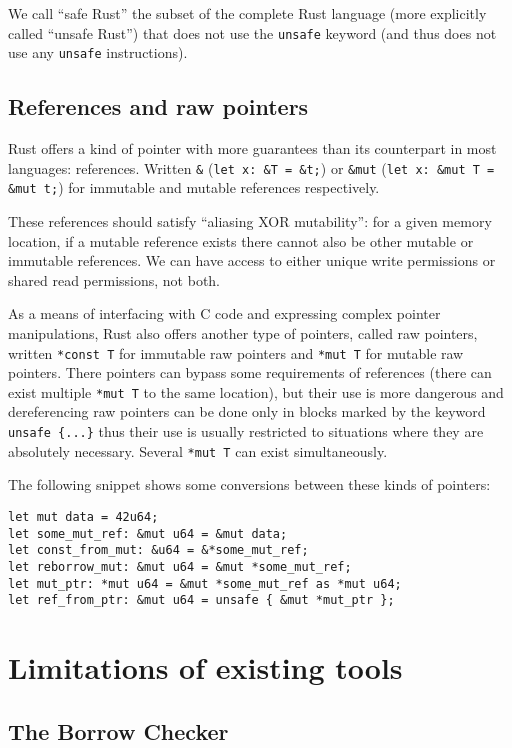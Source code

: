 \documentclass[a4paper,11pt]{article}
\theoremstyle{plain}
\theoremstyle{definition}
\theoremstyle{remark}
\begin{document}
We call ``safe Rust'' the subset of the complete Rust language (more explicitly called ``unsafe Rust'')
that does not use the \texttt{unsafe} keyword (and thus does not use any \texttt{unsafe}
instructions).

\subsection{References and raw pointers}

Rust offers a kind of pointer with more guarantees than its counterpart in most
languages: references. Written \texttt{\&} (\texttt{let x:~\&T = \&t;}) or
\texttt{\&mut} (\texttt{let x:~\&mut T = \&mut t;}) for immutable and mutable
references respectively.

These references should satisfy ``aliasing XOR mutability'': for a given memory
location, if a mutable reference exists there cannot also be other mutable or
immutable references. We can have access to either unique write permissions or
shared read permissions, not both.


As a means of interfacing with C code and expressing complex pointer manipulations,
Rust also offers another type of pointers, called raw pointers, written
\texttt{*const T} for immutable raw pointers and \texttt{*mut T} for mutable
raw pointers. There pointers can bypass some requirements of references (there
can exist multiple \texttt{*mut T} to the same location), but their use is more
dangerous and dereferencing raw pointers can be done only in blocks marked by
the keyword \texttt{unsafe \{...\}} thus their use is usually restricted to
situations where they are absolutely necessary.
Several \texttt{*mut T} can exist simultaneously.


The following snippet shows some conversions between these kinds of pointers:
\begin{lstlisting}
let mut data = 42u64;
let some_mut_ref: &mut u64 = &mut data;
let const_from_mut: &u64 = &*some_mut_ref;
let reborrow_mut: &mut u64 = &mut *some_mut_ref;
let mut_ptr: *mut u64 = &mut *some_mut_ref as *mut u64;
let ref_from_ptr: &mut u64 = unsafe { &mut *mut_ptr };
\end{lstlisting}

\section{Limitations of existing tools}

\subsection{The Borrow Checker}
\end{document}
